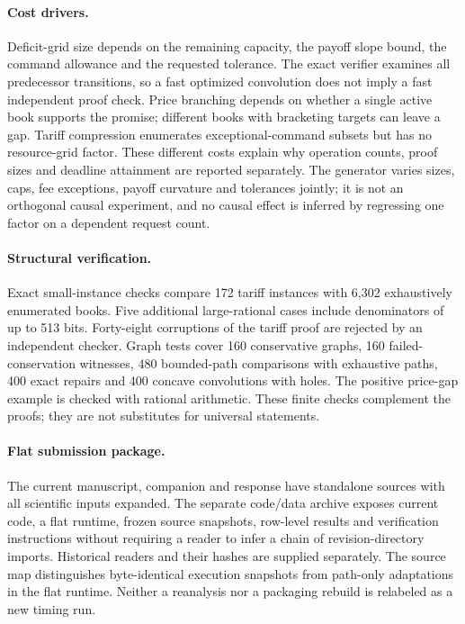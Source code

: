 \paragraph{Cost drivers.} Deficit-grid size depends on the remaining capacity, the payoff slope bound, the command allowance and the requested tolerance. The exact verifier examines all predecessor transitions, so a fast optimized convolution does not imply a fast independent proof check. Price branching depends on whether a single active book supports the promise; different books with bracketing targets can leave a gap. Tariff compression enumerates exceptional-command subsets but has no resource-grid factor. These different costs explain why operation counts, proof sizes and deadline attainment are reported separately. The generator varies sizes, caps, fee exceptions, payoff curvature and tolerances jointly; it is not an orthogonal causal experiment, and no causal effect is inferred by regressing one factor on a dependent request count.

\paragraph{Structural verification.} Exact small-instance checks compare 172 tariff instances with 6,302 exhaustively enumerated books. Five additional large-rational cases include denominators of up to 513 bits. Forty-eight corruptions of the tariff proof are rejected by an independent checker. Graph tests cover 160 conservative graphs, 160 failed-conservation witnesses, 480 bounded-path comparisons with exhaustive paths, 400 exact repairs and 400 concave convolutions with holes. The positive price-gap example is checked with rational arithmetic. These finite checks complement the proofs; they are not substitutes for universal statements.

\paragraph{Flat submission package.} The current manuscript, companion and response have standalone sources with all scientific inputs expanded. The separate code/data archive exposes current code, a flat runtime, frozen source snapshots, row-level results and verification instructions without requiring a reader to infer a chain of revision-directory imports. Historical readers and their hashes are supplied separately. The source map distinguishes byte-identical execution snapshots from path-only adaptations in the flat runtime. Neither a reanalysis nor a packaging rebuild is relabeled as a new timing run.
